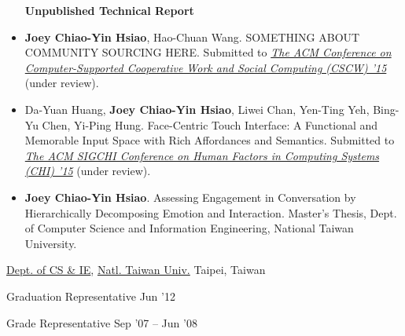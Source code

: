 \documentclass[10pt, a4paper]{article} %
\begin{document}
\begin{itemize}
\textbf{Unpublished Technical Report}
\item \textbf{Joey Chiao-Yin Hsiao}, Hao-Chuan Wang. SOMETHING ABOUT COMMUNITY SOURCING HERE. 
Submitted to \textit{\href{http://cscw.acm.org/2015/index.php}{The ACM Conference on Computer-Supported Cooperative Work and Social Computing (CSCW) '15}} (under review).
\item Da-Yuan Huang, \textbf{Joey Chiao-Yin Hsiao}, Liwei Chan, Yen-Ting Yeh, Bing-Yu Chen, Yi-Ping Hung.
Face-Centric Touch Interface: A Functional and Memorable Input Space with Rich Affordances and Semantics. 
Submitted to \textit{\href{http://chi2015.acm.org/}{The ACM SIGCHI Conference on Human Factors in Computing Systems (CHI) '15}} (under review).
\item \textbf{Joey Chiao-Yin Hsiao}. Assessing Engagement in Conversation by Hierarchically Decomposing Emotion and Interaction. 
Master's Thesis, Dept. of Computer Science and Information Engineering, National Taiwan University.

\end{itemize}

\spacedhrule{0.5em}{-1em} %




\headedsection %
{\href{http://www.csie.ntu.edu.tw}{Dept. of CS \& IE}, \href{http://www.ntu.edu.tw}{Natl. Taiwan Univ.}}
{Taipei, Taiwan}
{
	\headedsubsection %
	{Graduation Representative}
	{Jun '12} 
	{}

	\headedsubsection %
	{Grade Representative}
	{Sep '07 -- Jun '08} 
	{}

}

\spacedhrule{1.5em}{-1em} %


\end{document}
